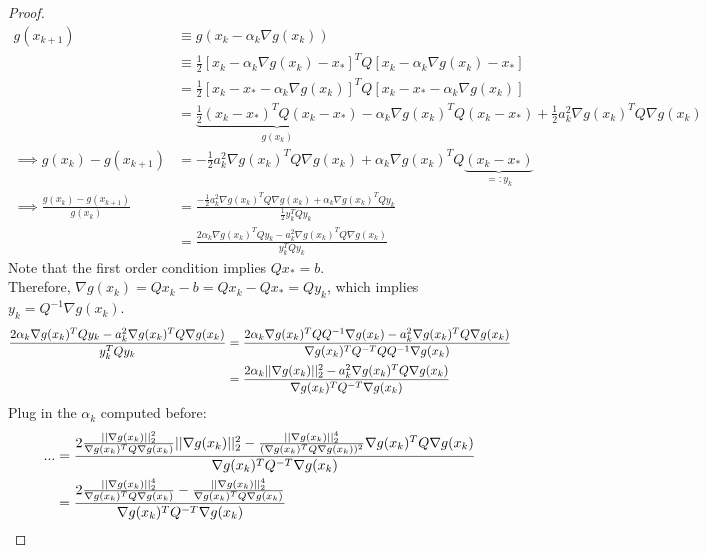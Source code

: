 \documentclass{article}
\begin{document}
	\begin{proof}
		\begin{align}
			g(x_{k+1}) &\equiv g(x_k - \alpha_k \nabla g(x_k)) \\
			&\equiv \frac{1}{2} [x_k - \alpha_k \nabla g(x_k) - x_*]^T Q [x_k - \alpha_k \nabla g(x_k) - x_*] \\
			&= \frac{1}{2} [x_k - x_* - \alpha_k \nabla g(x_k)]^T Q [x_k - x_* - \alpha_k \nabla g(x_k)] \\
			&= \underbrace{\frac{1}{2} (x_k - x_*)^T Q (x_k - x_*)}_{g(x_k)} - \alpha_k \nabla g(x_k)^T Q (x_k - x_*) + \frac{1}{2} a_k^2 \nabla g(x_k)^T Q \nabla g(x_k) \\
			\implies g(x_k) - g(x_{k+1}) &= - \frac{1}{2} a_k^2 \nabla g(x_k)^T Q \nabla g(x_k) + \alpha_k \nabla g(x_k)^T Q \underbrace{(x_k - x_*)}_{=:y_k} \\
			\implies \frac{g(x_k) - g(x_{k+1})}{g(x_k)} &= \frac{- \frac{1}{2} a_k^2 \nabla g(x_k)^T Q \nabla g(x_k) + \alpha_k \nabla g(x_k)^T Q y_k}{\frac{1}{2} y_k^T Q y_k} \\
			&= \frac{2 \alpha_k \nabla g(x_k)^T Q y_k - a_k^2 \nabla g(x_k)^T Q \nabla g(x_k)}{y_k^T Q y_k}
		\end{align}
		Note that the first order condition implies $Qx_* = b$. \\
		Therefore, $\nabla g(x_k) = Qx_k - b = Q x_k - Qx_* = Qy_k$, which implies $y_k = Q^{-1} \nabla g(x_k)$.
		\begin{align}
			\frac{2 \alpha_k \nabla g(x_k)^T Q y_k - a_k^2 \nabla g(x_k)^T Q \nabla g(x_k)}{y_k^T Q y_k}
			&= \frac{2 \alpha_k \nabla g(x_k)^T Q Q^{-1}\nabla g(x_k) - a_k^2 \nabla g(x_k)^T Q \nabla g(x_k)}{\nabla g(x_k)^T Q^{-T} Q Q^{-1} \nabla g(x_k)} \\
			&= \frac{2 \alpha_k \vert \vert {\nabla g(x_k)} \vert \vert_2^2 - a_k^2 \nabla g(x_k)^T Q \nabla g(x_k)}{\nabla g(x_k)^T Q^{-T} \nabla g(x_k)}
		\end{align}
		Plug in the $\alpha_k$ computed before:
		\begin{align}
			... &= \frac{2 \frac{\norm{\nabla g(x_k)}_2^2}{\nabla g(x_k)^T Q \nabla g(x_k)} \norm{\nabla g(x_k)}_2^2 -  \frac{\norm{\nabla g(x_k)}_2^4}{(\nabla g(x_k)^T Q \nabla g(x_k))^2} \nabla g(x_k)^T Q \nabla g(x_k)}{\nabla g(x_k)^T Q^{-T} \nabla g(x_k)} \\
			&= \frac{2 \frac{\norm{\nabla g(x_k)}_2^4}{\nabla g(x_k)^T Q \nabla g(x_k)} - \frac{\norm{\nabla g(x_k)}_2^4}{\nabla g(x_k)^T Q \nabla g(x_k)}}{\nabla g(x_k)^T Q^{-T} \nabla g(x_k)} \\

\end{align}
\end{proof}
\end{document}

